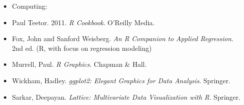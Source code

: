\documentclass{article}
\begin{document}
\begin{itemize}

\item[] Computing:
\item Paul Teetor. 2011. \emph{R Cookbook}. O'Reilly Media.
\item Fox, John and Sanford Weisberg. \emph{An R Companion to Applied Regression}. 2nd ed. (R, with focus on regression modeling)
\item Murrell, Paul. \emph{R Graphics}. Chapman \& Hall.
\item Wickham, Hadley. \emph{ggplot2: Elegant Graphics for Data Analysis}. Springer.
\item Sarkar, Deepayan. \emph{Lattice: Multivariate Data Visualization with R}. Springer.
\end{itemize}





%
\end{document}
